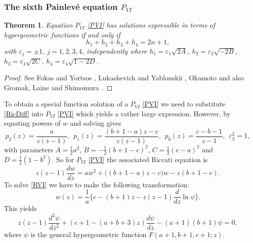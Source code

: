 \documentclass[12pt]{article}
\def\P{Painlev\'e }
\newtheorem{mydef}{Theorem}[section]
\numberwithin{figure}{section}
\numberwithin{equation}{section}
\numberwithin{table}{section}
\begin{document}
\subsubsection{The sixth \P equation  $P_{VI}$}
\begin{mydef}
Equation $P_{VI}$ \eqref{PVI} has solutions expressible in terms of hypergeometric functions if and only if
$$h_1+h_2+h_3+h_4=2n+1,$$
with $\varepsilon_j=\pm1$, $j=1,2,3,4$, independently where $h_1=\varepsilon_1\sqrt{2A}$, $h_2=\varepsilon_2\sqrt{-2B}$, $h_3=\varepsilon_3\sqrt{2C}$, $h_4=\varepsilon_4\sqrt{1-2D}$.
\end{mydef}
\begin{proof}
See Fokas and Yortsos \cite{P:30:544}, Lukashevich and Yablonskii \cite{P:3:266}, Okamoto \cite{P:146:337} and also Gromak, Laine and Shimomura \cite{deGruyerCo}.
\end{proof}
To obtain a special function solution of a $P_{VI}$ \eqref{PVI} we need to substitute \eqref{RicDiff} into $P_{VI}$ \eqref{PVI} which yields
a rather large expression. However, by equating powers of $w$ and solving gives
$$p_2(z)=\frac{a}{z(z-1)},~~p_1(z)=\frac{(b+1-a)z-c}{z(z-1)},~~p_0(z)=\frac{c-b-1}{z-1},~~\varepsilon_3^2=1,$$
with parameters $A=\tfrac{1}{2}a^2$, $B=-\tfrac{1}{2}(b+1-c)^2$, $C=\tfrac{1}{2}(c-a)^2$ and $D=\tfrac{1}{2}(1-b^2)$.
So for $P_{VI}$ \eqref{PVI} the associated Riccati equation is
\begin{equation}
z(z-1)\frac{dw}{dz}=a w^2+\big((b+1-a)z-c\big)w-z(b+1-c).\label{RVI}
\end{equation}
To solve \eqref{RVI} we have to make the following transformation:
$$w(z)=\frac{1}{a}\bigg\{c-(b+1)z-z(z-1)\frac{d}{dz}\ln\psi\bigg\}.$$
This yields
\begin{equation}
z(z-1)\frac{d^2\psi}{dz^2}+(c+1-(a+b+3)z)\frac{d\psi}{dz}-(a+1)(b+1)\psi=0,
\end{equation}
where $\psi$ is the general hypergeometric function $F(a+1,b+1,c+1;z)$.
\end{document}
